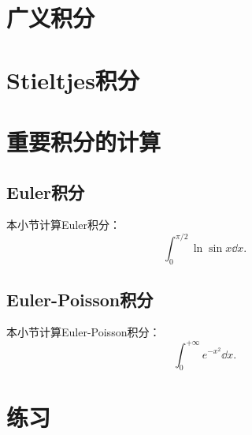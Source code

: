     \section{广义积分}

    \section{Stieltjes积分}
    \section{重要积分的计算}
    \subsection{Euler积分}
    本小节计算Euler积分：$$\int_{0}^{\pi/2}\ln\sin x\dd x.$$
    \subsection{Euler-Poisson积分}
    本小节计算Euler-Poisson积分：$$\int_{0}^{+\infty}e^{-x^2}\dd x.$$
    \section{练习}
